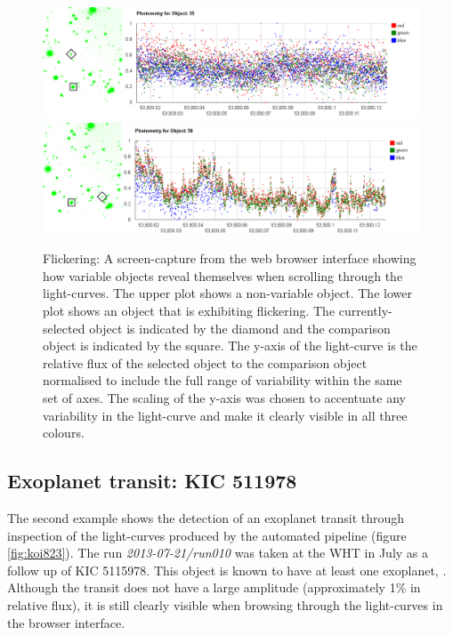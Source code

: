 \begin{figure}
\centering
\includegraphics[width=150mm]{images/gumus-comparison-lc.png}
\includegraphics[width=150mm]{images/gumus-discovery-lc.png}
\caption{Flickering: A screen-capture from the web browser interface showing how variable objects reveal themselves when scrolling through the light-curves. The upper plot shows a non-variable object. The lower plot shows an object that is exhibiting flickering.  The currently-selected object is indicated by the diamond and the comparison object is indicated by the square. The y-axis of the light-curve is the relative flux of the selected object to the comparison object normalised to include the full range of variability within the same set of axes. The scaling of the y-axis was chosen to accentuate any variability in the light-curve and make it clearly visible in all three colours.}
\label{fig:gumus-discovery}
\end{figure}

\subsection{Exoplanet transit: KIC 511978}
The second example shows the detection of an exoplanet transit through inspection of the light-curves produced by the automated pipeline (figure \ref{fig:koi823}). The run \emph{2013-07-21/run010} was taken at the WHT in July as a follow up of KIC 5115978. This object is known to have at least one exoplanet, \citep{KIC5115978}. Although the transit does not have a large amplitude (approximately 1\% in relative flux), it is still clearly visible when browsing through the light-curves in the browser interface. 

